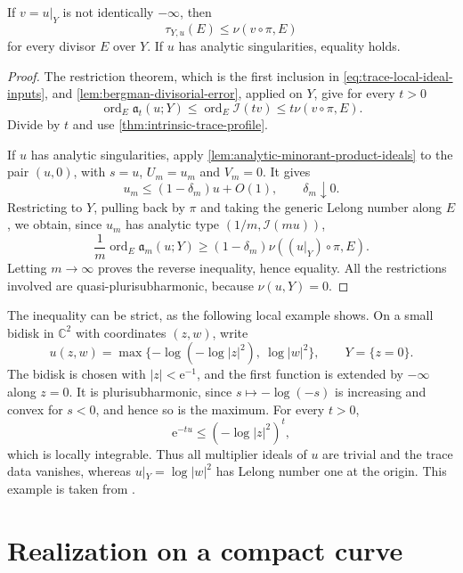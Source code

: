 \begin{proposition}\label{prop:trace-naive-comparison}
If $v=u|_Y$ is not identically $-\infty$, then
\[
 \tau_{Y,u}(E)\leq\nu(v\circ\pi,E)
\]
for every divisor $E$ over $Y$. If $u$ has analytic singularities, equality holds.
\end{proposition}
\begin{proof}
The restriction theorem, which is the first inclusion in \eqref{eq:trace-local-ideal-inputs}, and \cref{lem:bergman-divisorial-error}, applied on $Y$, give for every $t>0$
\[
 \operatorname{ord}_E\mathfrak a_t(u;Y)
 \leq\operatorname{ord}_E\mathcal I(tv)
 \leq t\nu(v\circ\pi,E).
\]
Divide by $t$ and use \cref{thm:intrinsic-trace-profile}.

If $u$ has analytic singularities, apply \cref{lem:analytic-minorant-product-ideals} to the pair $(u,0)$, with $s=u$, $U_m=u_m$ and $V_m=0$. It gives
\[
 u_m\leq(1-\delta_m)u+O(1),\qquad\delta_m\downarrow0.
\]
Restricting to $Y$, pulling back by $\pi$ and taking the generic Lelong number along $E$, we obtain, since $u_m$ has analytic type $(1/m,\mathcal I(mu))$,
\[
 \frac1m\operatorname{ord}_E\mathfrak a_m(u;Y)
 \geq(1-\delta_m)\nu((u|_Y)\circ\pi,E).
\]
Letting $m\to\infty$ proves the reverse inequality, hence equality. All the restrictions involved are quasi-plurisubharmonic, because $\nu(u,Y)=0$.
\end{proof}

The inequality can be strict, as the following local example shows. On a small bidisk in $\mathbb C^2$ with coordinates $(z,w)$, write
\[
 u(z,w)=\max\{-\log(-\log|z|^2),\ \log|w|^2\},
 \qquad Y=\{z=0\}.
\]
The bidisk is chosen with $|z|<\mathrm{e}^{-1}$, and the first function is extended by $-\infty$ along $z=0$. It is plurisubharmonic, since $s\mapsto-\log(-s)$ is increasing and convex for $s<0$, and hence so is the maximum. For every $t>0$,
\[
 \mathrm{e}^{-tu}\leq(-\log|z|^2)^t,
\]
which is locally integrable. Thus all multiplier ideals of $u$ are trivial and the trace data vanishes, whereas $u|_Y=\log|w|^2$ has Lelong number one at the origin. This example is taken from \cite[Example~8.1.2]{SGPT}.



\section{Realization on a compact curve}\label{sec:curve-trace-realization}

